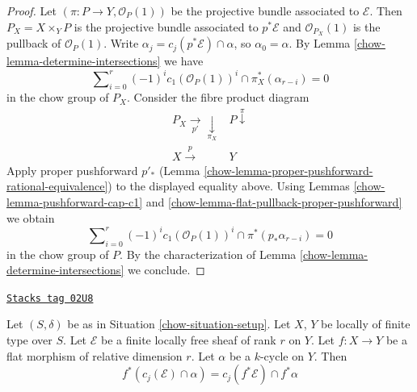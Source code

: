 \begin{proof}

Let $(\pi : P \to Y, \mathcal{O}_P(1))$ be the projective bundle associated
to $\mathcal{E}$. Then $P_X = X \times_Y P$ is the projective bundle associated
to $p^*\mathcal{E}$ and $\mathcal{O}_{P_X}(1)$ is the pullback of
$\mathcal{O}_P(1)$. Write $\alpha_j = c_j(p^*\mathcal{E}) \cap \alpha$, so
$\alpha_0 = \alpha$. By Lemma \ref{chow-lemma-determine-intersections} we have
$$
\sum\nolimits_{i = 0}^r
(-1)^i c_1(\mathcal{O}_P(1))^i \cap
\pi_X^*(\alpha_{r - i}) = 0
$$
in the chow group of $P_X$. Consider the fibre product diagram
$$
\begin{array}{cc}P_X \underset{p'}{\longrightarrow}\underset{\pi_X}{\downarrow} & P \overset{\pi}{\downarrow} \\ X \overset{p}{\longrightarrow} & Y\end{array}
$$
Apply proper pushforward $p'_*$
(Lemma \ref{chow-lemma-proper-pushforward-rational-equivalence})
to the displayed equality above. Using
Lemmas \ref{chow-lemma-pushforward-cap-c1} and
\ref{chow-lemma-flat-pullback-proper-pushforward} we obtain
$$
\sum\nolimits_{i = 0}^r
(-1)^i c_1(\mathcal{O}_P(1))^i \cap
\pi^*(p_*\alpha_{r - i}) = 0
$$
in the chow group of $P$. By the characterization of
Lemma \ref{chow-lemma-determine-intersections} we conclude.
\end{proof}

\begin{lemma}
\label{chow-lemma-flat-pullback-cap-cj}
\href{https://stacks.math.columbia.edu/tag/02U8}{\texttt{Stacks tag 02U8}}

Let $(S, \delta)$ be as in Situation \ref{chow-situation-setup}.
Let $X$, $Y$ be locally of finite type over $S$.
Let $\mathcal{E}$ be a finite locally free sheaf of rank $r$ on $Y$.
Let $f : X \to Y$ be a flat morphism of relative dimension $r$.
Let $\alpha$ be a $k$-cycle on $Y$.
Then
$$
f^*(c_j(\mathcal{E}) \cap \alpha) = c_j(f^*\mathcal{E}) \cap f^*\alpha
$$
\end{lemma}

